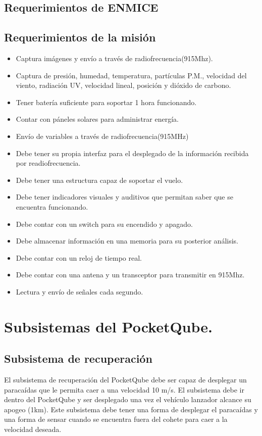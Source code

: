\documentclass{article}%
\begin{document}
\subsection{Requerimientos de ENMICE}
\subsection{Requerimientos de la misión}
\begin{itemize}
  \item Captura imágenes y envío a través de radiofrecuencia(915Mhz).
  \item Captura de presión, humedad, temperatura, partículas P.M., velocidad del viento, radiación UV, velocidad lineal, posición
   y dióxido de carbono.
  \item Tener batería suficiente para soportar 1 hora funcionando.
  \item Contar con páneles solares para administrar energía.
  \item Envío de variables a través de radiofrecuencia(915MHz)
  \item Debe tener su propia interfaz para el desplegado de la información recibida por readiofrecuencia.
  \item Debe tener una estructura capaz de soportar el vuelo.
  \item Debe tener indicadores visuales y auditivos que permitan saber que se encuentra funcionando.
  \item Debe contar con un switch para su encendido y apagado.
  \item Debe almacenar información en una memoria para su posterior análisis.
  \item Debe contar con un reloj de tiempo real.
  \item Debe contar con una antena y un transceptor para transmitir en 915Mhz.
  \item Lectura y envío de señales cada segundo.
\end{itemize}
\section{Subsistemas del PocketQube.}
\subsection{Subsistema de recuperación}
\justify
El subsistema de recuperación del PocketQube debe ser capaz de desplegar un paracaídas que le permita caer a una velocidad 10 m/s. El 
subsistema debe ir dentro del PocketQube y ser desplegado una vez el vehículo lanzador alcance su apogeo (1km). Este subsistema debe 
tener una forma de desplegar el paracaídas y una forma de sensar cuando se encuentra fuera del cohete para caer a la velocidad deseada.
\end{document}
